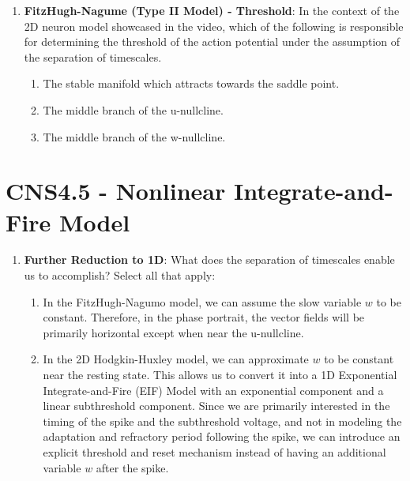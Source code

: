 \documentclass[11pt,letterpaper]{article}
\begin{document}
\begin{enumerate}
    \item \textbf{FitzHugh-Nagume (Type II Model) - Threshold}: In the context of the 2D neuron model showcased in the video, which of the following is responsible for determining the threshold of the action potential under the assumption of the separation of timescales.
    \begin{enumerate}
        \item The stable manifold which attracts towards the saddle point.
        \item The middle branch of the u-nullcline.
        \item The middle branch of the w-nullcline.
    \end{enumerate}

\end{enumerate}
\pagebreak

\section{CNS4.5 - Nonlinear Integrate-and-Fire Model}
\begin{enumerate}
    \item \textbf{Further Reduction to 1D}: What does the separation of timescales enable us to accomplish? Select all that apply:
    \begin{enumerate}
        \item In the FitzHugh-Nagumo model, we can assume the slow variable $w$ to be constant. Therefore, in the phase portrait, the vector fields will be primarily horizontal except when near the u-nullcline.
        \item In the 2D Hodgkin-Huxley model, we can approximate $w$ to be constant near the resting state. This allows us to convert it into a 1D Exponential Integrate-and-Fire (EIF) Model with an exponential component and a linear subthreshold component. Since we are primarily interested in the timing of the spike and the subthreshold voltage, and not in modeling the adaptation and refractory period following the spike, we can introduce an explicit threshold and reset mechanism instead of having an additional variable $w$ after the spike.
    \end{enumerate}

\end{enumerate}
\pagebreak
\end{document}
